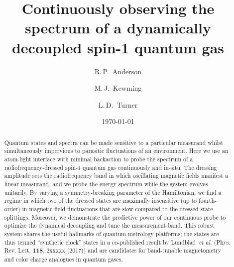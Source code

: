 \documentclass[aps,prl,reprint,superscriptaddress,floatfix]{revtex4-1}
\begin{document}
\title{Continuously observing the spectrum of a dynamically decoupled spin-1 quantum gas}

\author{R.\,P.~Anderson}
\author{M.\,J.~Kewming }
\author{L.\,D.~Turner}

\date{\today}

\begin{abstract}
Quantum states and spectra can be made sensitive to a particular measurand whilst simultaneously impervious to parasitic fluctuations of an environment.
Here we use an atom-light interface with minimal backaction to probe the spectrum of a radiofrequency-dressed spin-1 quantum gas continuously and in-situ.
The dressing amplitude sets the radiofrequency band in which oscillating magnetic fields manifest a linear measurand, and we probe the energy spectrum while the system evolves unitarily.
By varying a symmetry-breaking parameter of the Hamiltonian, we find a regime in which two of the dressed states are maximally insensitive (up to fourth-order) in magnetic field fluctuations that are slow compared to the dressed-state splittings.
Moreover, we demonstrate the predictive power of our continuous probe to optimize the dynamical decoupling and tune the measurement band.
This robust system shares the useful hallmarks of quantum metrology platforms; the states are thus termed ``synthetic clock'' states in a co-published result by Lundblad~\emph{et al.} (Phys. Rev. Lett. \textbf{118}, 2xxxxx (2017)) and are candidates for band-tunable magnetometry and color charge analogues in quantum gases. 
\end{abstract}

\maketitle
\end{document}
